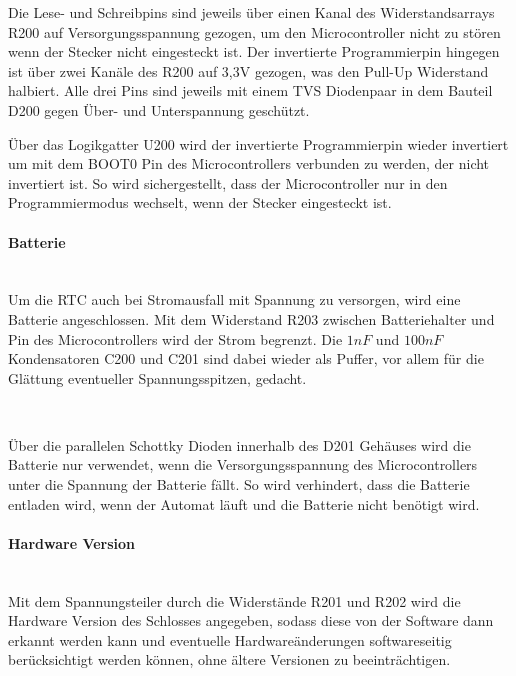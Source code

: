 Die Lese- und Schreibpins sind jeweils über einen Kanal des Widerstandsarrays R200 auf Versorgungsspannung gezogen, um
den Microcontroller nicht zu stören wenn der Stecker nicht eingesteckt ist. Der invertierte Programmierpin hingegen ist über zwei
Kanäle des R200 auf 3,3V gezogen, was den Pull-Up Widerstand halbiert. Alle drei Pins sind jeweils mit einem TVS Diodenpaar in 
dem Bauteil D200 gegen Über- und Unterspannung geschützt.

Über das Logikgatter U200 wird der invertierte Programmierpin wieder invertiert um mit dem BOOT0 Pin des Microcontrollers verbunden 
zu werden, der nicht invertiert ist. So wird sichergestellt, dass der Microcontroller nur in den Programmiermodus wechselt, wenn
der Stecker eingesteckt ist. 

\paragraph{Batterie}\mbox{}\\
Um die \ac{RTC} auch bei Stromausfall mit Spannung zu versorgen, wird eine Batterie angeschlossen. Mit dem
Widerstand R203 zwischen Batteriehalter und Pin des Microcontrollers wird der Strom begrenzt.
Die \(1nF\) und \(100nF\) Kondensatoren C200 und C201 sind dabei wieder als Puffer, vor allem für die Glättung
eventueller Spannungsspitzen, gedacht.

\

Über die parallelen Schottky Dioden innerhalb des D201 Gehäuses wird die Batterie nur verwendet, wenn die Versorgungsspannung
des Microcontrollers unter die Spannung der Batterie fällt. So wird verhindert, dass die Batterie entladen wird, wenn der
Automat läuft und die Batterie nicht benötigt wird.

\paragraph{Hardware Version}\mbox{}\\
Mit dem Spannungsteiler durch die Widerstände R201 und R202 wird die Hardware Version des Schlosses angegeben, sodass diese
von der Software dann erkannt werden kann und eventuelle Hardwareänderungen softwareseitig berücksichtigt werden können, ohne
ältere Versionen zu beeinträchtigen.

